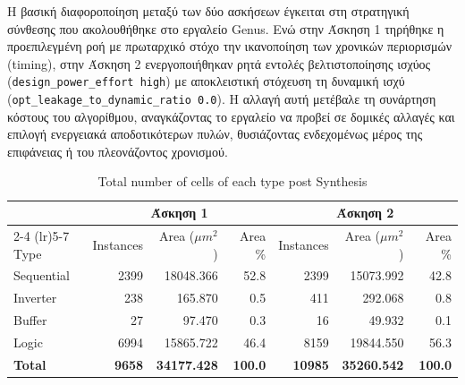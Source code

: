 Η βασική διαφοροποίηση μεταξύ των δύο ασκήσεων έγκειται στη στρατηγική σύνθεσης που ακολουθήθηκε στο εργαλείο Genus. Ενώ στην Άσκηση 1 τηρήθηκε η προεπιλεγμένη ροή με πρωταρχικό στόχο την ικανοποίηση των χρονικών περιορισμών (timing), στην Άσκηση 2 ενεργοποιήθηκαν ρητά εντολές βελτιστοποίησης ισχύος (\texttt{design\_power\_effort high}) με αποκλειστική στόχευση τη δυναμική ισχύ (\texttt{opt\_leakage\_to\_dynamic\_ratio 0.0}). Η αλλαγή αυτή μετέβαλε τη συνάρτηση κόστους του αλγορίθμου, αναγκάζοντας το εργαλείο να προβεί σε δομικές αλλαγές και επιλογή ενεργειακά αποδοτικότερων πυλών, θυσιάζοντας ενδεχομένως μέρος της επιφάνειας ή του πλεονάζοντος χρονισμού.

\begin{table}[H]
    \centering
    \caption{Total number of cells of each type post Synthesis}
    \begin{tabular}{lrrrrrr}
        \toprule
         & \multicolumn{3}{c}{\textbf{Άσκηση 1}} & \multicolumn{3}{c}{\textbf{Άσκηση 2}} \\
        \cmidrule(lr){2-4} \cmidrule(lr){5-7}
        Type & Instances & Area ($\mu m^2$) & Area \% & Instances & Area ($\mu m^2$) & Area \% \\
        \midrule
        Sequential & 2399 & 18048.366 & 52.8 & 2399 & 15073.992 & 42.8 \\
        Inverter & 238 & 165.870 & 0.5 & 411 & 292.068 & 0.8 \\
        Buffer & 27 & 97.470 & 0.3 & 16 & 49.932 & 0.1 \\
        Logic & 6994 & 15865.722 & 46.4 & 8159 & 19844.550 & 56.3 \\
        \midrule
        \textbf{Total} & \textbf{9658} & \textbf{34177.428} & \textbf{100.0} & \textbf{10985} & \textbf{35260.542} & \textbf{100.0} \\
        \bottomrule
    \end{tabular}
\end{table}

